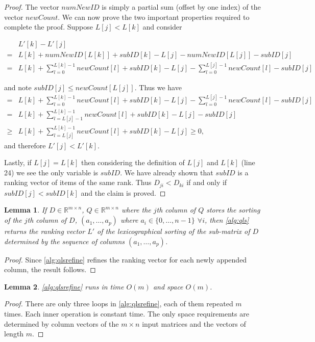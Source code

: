 \documentclass[a4paper,10pt,reqno]{amsart}
\newcommand\R{\mathbb R}
\newtheorem{lemma}{Lemma}
\theoremstyle{definition}
\begin{document}
\begin{proof}
The vector $numNewID$ is simply a partial sum (offset by one index) of the vector
$newCount$. We can now prove the two important properties required to complete
the proof.  Suppose $L[j] < L[k]$ and consider

\begin{align*}
    & L'[k]  -  L'[j] \\ 
    = & L[k] + numNewID[L[k]] + subID[k] -  L[j] - numNewID[L[j]] - subID[j] \\ 
    = &L[k] + \sum_{l=0}^{L[k]-1} newCount[l] + subID[k] - L[j] - \sum_{l=0}^{L[j]-1} newCount[l] - subID[j] 
\end{align*}

and note $subID[j] \leq newCount[L[j]]$.
Thus we have 
\begin{align*}
    = &L[k] + \sum_{l=0}^{L[k]-1} newCount[l] + subID[k] - L[j] - \sum_{l=0}^{L[j]-1} newCount[l] - subID[j] \\
    = &L[k] + \sum_{l=L[j]-1}^{L[k]-1} newCount[l] + subID[k] - L[j]- subID[j] \\
    \geq &L[k] + \sum_{l=L[j]}^{L[k]-1} newCount[l] + subID[k] - L[j] \geq 0,
\end{align*}
and therefore $L'[j] < L'[k]$.

Lastly, if $L[j] = L[k]$ then considering the definition of $L[j]$ and $L[k]$
(line 24) we see the only variable is $subID$. We have already shown
that $subID$ is a ranking vector of items of the same rank. Thus $D_{ji} < D_{ki}$
if and only if $subID[j] < subID[k]$ and the claim is proved.
\end{proof}

\begin{lemma} 
\label{lem:qls}
If $D \in \R^{m \times n}$, $Q \in \R^{m \times n}$ where the $j$th column of
$Q$ stores the sorting of the $j$th column of
$D$, $(a_1,\ldots,a_p)$ where $ a_i \in \{0,\ldots,n-1\}$ $\forall i$, then
\autoref{alg:qls} returns the ranking vector $L'$ of the lexicographical
sorting  of the sub-matrix of $D$ determined by the sequence of columns
$(a_1,\ldots,a_p)$.
\end{lemma}
\begin{proof}
Since \autoref{alg:qlsrefine} refines the ranking vector for each newly
appended column, the result follows.
\end{proof}

\begin{lemma} 
\autoref{alg:qlsrefine} runs in time $O(m)$ and space $O(m)$.
\label{lem:qlsrefineruntime}
\end{lemma}
\begin{proof}
There are only three loops in \autoref{alg:qlsrefine}, each of them
repeated $m$ times. Each inner operation is constant time.  The only space
requirements are determined by column vectors of the $m \times n $ input
matrices and the vectors of length $m$.
\end{proof}
\end{document}
